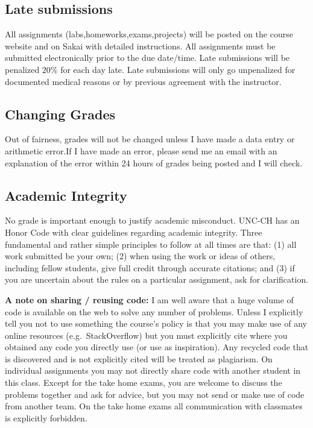 \documentclass[11pt,]{article}
\begin{document}
\hypertarget{late-submissions}{%
\subsection{Late submissions}\label{late-submissions}}

All assignments (labs,homeworks,exams,projects) will be posted on the
course website and on Sakai with detailed instructions. All assignments
must be submitted electronically prior to the due date/time. Late
submissions will be penalized 20\% for each day late. Late submissions
will only go unpenalized for documented medical reasons or by previous
agreement with the instructor.

\hypertarget{changing-grades}{%
\subsection{Changing Grades}\label{changing-grades}}

Out of fairness, grades will not be changed unless I have made a data
entry or arithmetic error.If I have made an error, please send me an
email with an explanation of the error within 24 hours of grades being
posted and I will check.

\hypertarget{academic-integrity}{%
\subsection{Academic Integrity}\label{academic-integrity}}

No grade is important enough to justify academic misconduct. UNC-CH has
an Honor Code with clear guidelines regarding academic integrity. Three
fundamental and rather simple principles to follow at all times are
that: (1) all work submitted be your own; (2) when using the work or
ideas of others, including fellow students, give full credit through
accurate citations; and (3) if you are uncertain about the rules on a
particular assignment, ask for clarification.

\textbf{A note on sharing / reusing code:} I am well aware that a huge
volume of code is available on the web to solve any number of problems.
Unless I explicitly tell you not to use something the course's policy is
that you may make use of any online resources (e.g.~StackOverflow) but
you must explicitly cite where you obtained any code you directly use
(or use as inspiration). Any recycled code that is discovered and is not
explicitly cited will be treated as plagiarism. On individual
assignments you may not directly share code with another student in this
class. Except for the take home exams, you are welcome to discuss the
problems together and ask for advice, but you may not send or make use
of code from another team. On the take home exams all communication with
classmates is explicitly forbidden.
\end{document}
